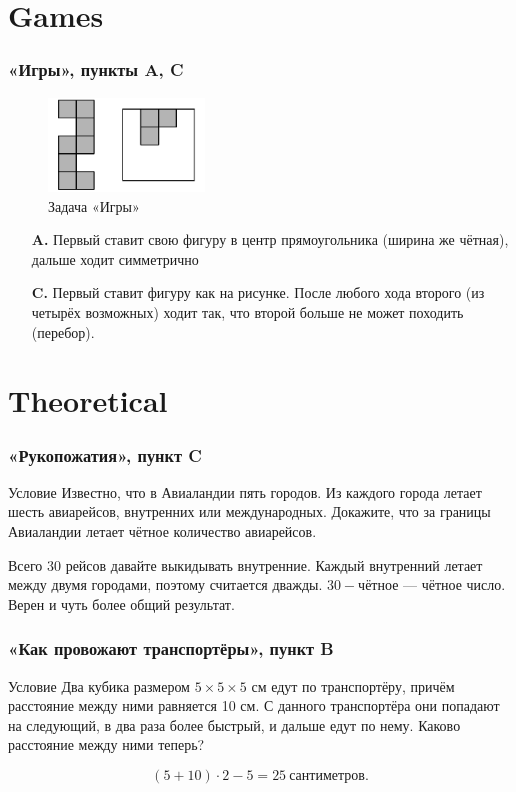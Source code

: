 \documentclass[aspectratio=1610,12pt]{beamer}
\def\fram#1#2{\begin{frame}\frametitle{\bf #1}#2\end{frame}}
\def\scolon{\rlap{,}\raisebox{0.8ex}{,} }
\begin{document}
\section[Игры]{Games}
\fram{«Игры», пункты A, C}{
\begin{figure}
	\includegraphics[height=2.5cm]{images/games}
	\caption{Задача «Игры»}
\end{figure} \vspace{-0.6cm}
\begin{itemize}
\item[\bf A.] Первый ставит свою фигуру в центр прямоугольника (ширина же чётная), дальше ходит симметрично\scolon
\item[\bf C.] Первый ставит фигуру как на рисунке. После любого хода второго (из четырёх возможных) ходит так, что второй больше не может походить (перебор).
\end{itemize}
}


\section[Задачи и теория]{Theoretical}
\fram{«Рукопожатия», пункт C}{
\begin{block}{Условие}
Известно, что в Авиаландии пять городов. Из каждого города летает шесть авиарейсов, внутренних или международных. Докажите, что за границы Авиаландии летает чётное количество авиарейсов.
\end{block}
\vspace{0.4cm} \pause
\noindent Всего 30 рейсов\scolon давайте выкидывать внутренние. Каждый внутренний летает между двумя городами, поэтому считается дважды. $30 - \text{чётное}$ — чётное число.
\medskip\noindent Верен и чуть более общий результат.}

\fram{«Как провожают транспортёры», пункт B}{
\begin{block}{Условие}
Два кубика размером $5 \times 5 \times 5$ см едут по транспортёру, причём расстояние между ними равняется 10 см. С данного транспортёра они попадают на следующий, в два раза более быстрый, и дальше едут по нему. Каково расстояние между ними теперь?
\end{block} \pause
\vspace{-0.25cm}$$(5 + 10) \cdot 2 - 5 = 25\ \text{сантиметров}.$$
}
\end{document}
